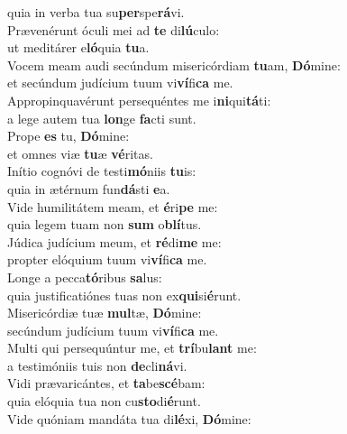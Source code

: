 \oddverse quia in verba tua su\textbf{per}spe\textbf{rá}vi.\\
\evenverse Prævenérunt óculi mei ad \textbf{te} di\textbf{lú}culo:~\*\\
\evenverse ut meditárer e\textbf{ló}quia \textbf{tu}a.\\
\oddverse Vocem meam audi secúndum misericórdiam \textbf{tu}am, \textbf{Dó}mine:~\*\\
\oddverse et secúndum judícium tuum vi\textbf{ví}fi\textbf{ca} me.\\
\evenverse Appropinquavérunt persequéntes me i\textbf{ni}qui\textbf{tá}ti:~\*\\
\evenverse a lege autem tua \textbf{lon}ge \textbf{fa}cti sunt.\\
\oddverse Prope \textbf{es} tu, \textbf{Dó}mine:~\*\\
\oddverse et omnes viæ \textbf{tu}æ \textbf{vé}ritas.\\
\evenverse Inítio cognóvi de testi\textbf{mó}niis \textbf{tu}is:~\*\\
\evenverse quia in ætérnum fun\textbf{dá}sti \textbf{e}a.\\
\oddverse Vide humilitátem meam, et \textbf{é}ri\textbf{pe} me:~\*\\
\oddverse quia legem tuam non \textbf{sum} o\textbf{blí}tus.\\
\evenverse Júdica judícium meum, et \textbf{ré}di\textbf{me} me:~\*\\
\evenverse propter elóquium tuum vi\textbf{ví}fi\textbf{ca} me.\\
\oddverse Longe a pecca\textbf{tó}ribus \textbf{sa}lus:~\*\\
\oddverse quia justificatiónes tuas non ex\textbf{qui}si\textbf{é}runt.\\
\evenverse Misericórdiæ tuæ \textbf{mul}tæ, \textbf{Dó}mine:~\*\\
\evenverse secúndum judícium tuum vi\textbf{ví}fi\textbf{ca} me.\\
\oddverse Multi qui persequúntur me, et \textbf{trí}bu\textbf{lant} me:~\*\\
\oddverse a testimóniis tuis non \textbf{de}cli\textbf{ná}vi.\\
\evenverse Vidi prævaricántes, et \textbf{ta}be\textbf{scé}bam:~\*\\
\evenverse quia elóquia tua non cu\textbf{sto}di\textbf{é}runt.\\
\oddverse Vide quóniam mandáta tua di\textbf{lé}xi, \textbf{Dó}mine:~\*\\
